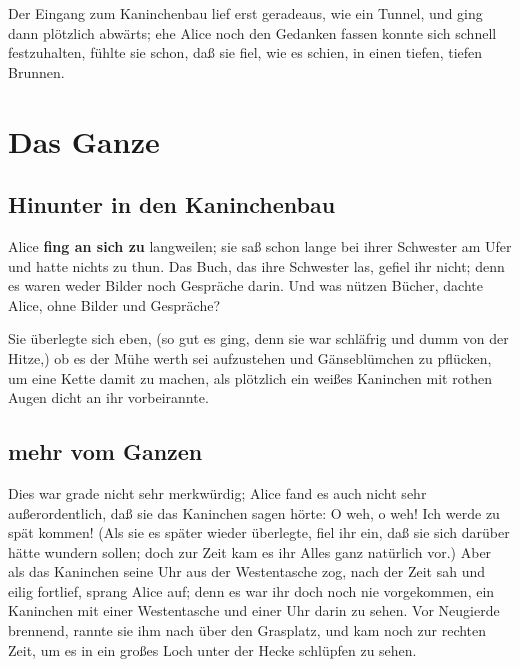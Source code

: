 \documentclass[DIV=calc,10pt,parskip=half,twocolumn]{scrartcl}
\begin{document}
Der Eingang zum Kaninchenbau lief erst geradeaus, wie ein Tunnel, und ging dann
plötzlich abwärts; ehe Alice noch den Gedanken fassen konnte sich schnell
festzuhalten, fühlte sie schon, daß sie fiel, wie es schien, in einen tiefen,
tiefen Brunnen.


\clearpage


\section{Das Ganze}



\subsection{Hinunter in den Kaninchenbau}

Alice {\bfseries fing an sich zu} langweilen; sie saß schon lange bei ihrer Schwester am
Ufer und hatte nichts zu thun. Das Buch, das ihre Schwester las, gefiel ihr
nicht; denn es waren weder Bilder noch Gespräche darin. \grqq{} Und was nützen
Bücher,\grqq{}  dachte Alice, \grqq{}ohne Bilder und Gespräche?\grqq 

Sie überlegte sich eben, (so gut es ging, denn sie war schläfrig und dumm von
der Hitze,) ob es der Mühe werth sei aufzustehen und Gänseblümchen zu pflücken,
um eine Kette damit zu machen, als plötzlich ein weißes Kaninchen mit rothen
Augen dicht an ihr vorbeirannte.

\subsection{mehr vom Ganzen}

Dies war grade nicht sehr merkwürdig; Alice fand es auch nicht sehr
außerordentlich, daß sie das Kaninchen sagen hörte: \grqq{} O weh, o weh! Ich werde zu
spät kommen!\grqq{}  (Als sie es später wieder überlegte, fiel ihr ein, daß sie sich
darüber hätte wundern sollen; doch zur Zeit kam es ihr Alles ganz natürlich
vor.) Aber als das Kaninchen seine Uhr aus der Westentasche zog, nach der Zeit
sah und eilig fortlief, sprang Alice auf; denn es war ihr doch noch nie
vorgekommen, ein Kaninchen mit einer Westentasche und einer Uhr darin zu sehen.
Vor Neugierde brennend, rannte sie ihm nach über den Grasplatz, und kam noch
zur rechten Zeit, um es in ein großes Loch unter der Hecke schlüpfen zu sehen.
\end{document}
